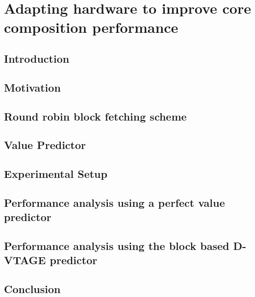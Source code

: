\chapter{Adapting hardware to improve core composition performance}

\section{Introduction}\label{sect:introduction-chapter3}

\section{Motivation}\label{sect:ch3-motivation}

\section{Round robin block fetching scheme}\label{chp3:sec:fetch}

\section{Value Predictor}
\label{chp3:sec:val}
\section{Experimental Setup}
\label{chp:chp3:sec:exp}
\section{Performance analysis using a perfect value predictor}
\label{chp:chp3:sec:analysis}
\section{Performance analysis using the block based D-VTAGE predictor}
\label{chp:chp3:sec:analysis2}
\section{Conclusion}

%
%